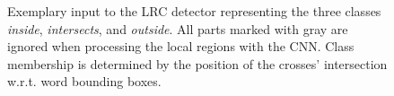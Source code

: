 \begin{figure}
	\centering
	\caption{Exemplary input to the LRC detector representing the three classes \emph{inside}, \emph{intersects}, and \emph{outside}. All parts marked with gray are ignored when processing the local regions with the CNN. Class membership is determined by the position of the crosses' intersection w.r.t. word bounding boxes.}
	\label{fig:lrc}
\end{figure}
